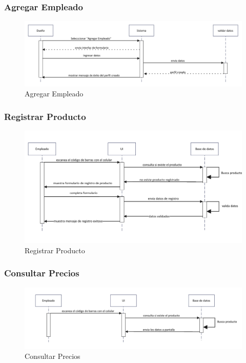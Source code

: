 \documentclass[twoside]{article}
\begin{document}
\subsubsection{Agregar Empleado}
\begin{figure}[!h]
    \centering
    \includegraphics[scale=0.9]{sequencediagram1.pdf}
    \caption{Agregar Empleado}
    \label{fig:enter-label}
\end{figure}

\subsubsection{Registrar Producto}
\begin{figure}[!h]
    \centering
    \includegraphics[scale=1]{sequencediagram2.pdf}
    \caption{Registrar Producto}
    \label{fig:enter-label}
\end{figure}

\newpage

\subsubsection{Consultar Precios}
\begin{figure}[!h]
    \centering
    \includegraphics[scale=0.95]{sequencediagram3.pdf}
    \caption{Consultar Precios}
    \label{fig:enter-label}
\end{figure}
\end{document}

